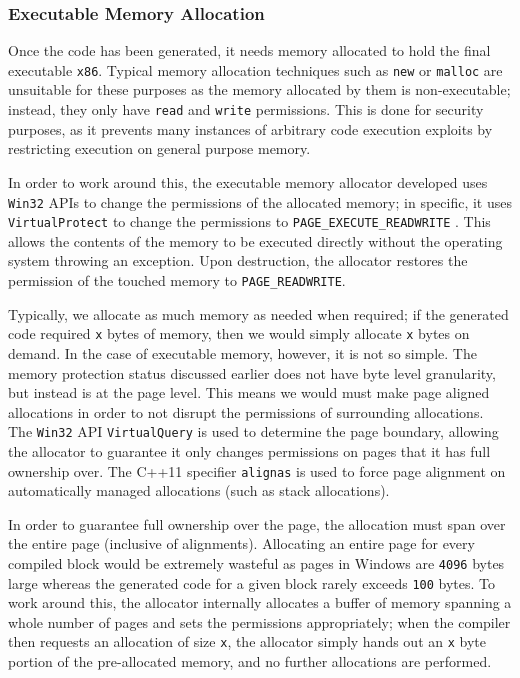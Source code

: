 \subsubsection{Executable Memory Allocation}

Once the code has been generated, it needs memory allocated to hold the final executable \texttt{x86}. Typical memory allocation techniques such as \texttt{new} or \texttt{malloc} are unsuitable for these purposes as the memory allocated by them is non-executable; instead, they only have \texttt{read} and \texttt{write} permissions. This is done for security purposes, as it prevents many instances of arbitrary code execution exploits by restricting execution on general purpose memory.

In order to work around this, the executable memory allocator developed uses \texttt{Win32} APIs to change the permissions of the allocated memory; in specific, it uses \texttt{VirtualProtect} \cite{win32-VirtualProtect} to change the permissions to \texttt{PAGE\_EXECUTE\_READWRITE} \cite{win-mem-protection}. This allows the contents of the memory to be executed directly without the operating system throwing an exception. Upon destruction, the allocator restores the permission of the touched memory to \texttt{PAGE\_READWRITE}.

Typically, we allocate as much memory as needed when required; if the generated code required \texttt{x} bytes of memory, then we would simply allocate \texttt{x} bytes on demand. In the case of executable memory, however, it is not so simple. The memory protection status discussed earlier does not have byte level granularity, but instead is at the page level. This means we would must make page aligned allocations in order to not disrupt the permissions of surrounding allocations. The \texttt{Win32} API \texttt{VirtualQuery} \cite{win32-VirtualQuery} is used to determine the page boundary, allowing the allocator to guarantee it only changes permissions on pages that it has full ownership over. The C++11 specifier \texttt{alignas} \cite{cpp-alignas} is used to force page alignment on automatically managed allocations (such as stack allocations).

In order to guarantee full ownership over the page, the allocation must span over the entire page (inclusive of alignments). Allocating an entire page for every compiled block would be extremely wasteful as pages in Windows are \texttt{4096} bytes large whereas the generated code for a given block rarely exceeds \texttt{100} bytes. To work around this, the allocator internally allocates a buffer of memory spanning a whole number of pages and sets the permissions appropriately; when the compiler then requests an allocation of size \texttt{x}, the allocator simply hands out an \texttt{x} byte portion of the pre-allocated memory, and no further allocations are performed.